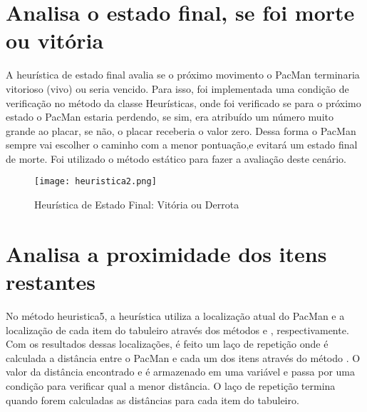 \documentclass[12pt, a4paper, english, brazil]{abntex2}
\begin{document}
    \section{Analisa o estado final, se foi morte ou vitória}
 A heurística de estado final avalia se o próximo movimento o PacMan terminaria vitorioso (vivo) ou seria vencido. Para isso, foi implementada uma condição de verificação no método da classe Heurísticas, onde foi verificado se para o próximo estado o PacMan estaria perdendo, se sim, era atribuído um número muito grande ao placar, se não, o placar receberia o valor zero.
 Dessa forma o PacMan sempre vai escolher o caminho com a menor pontuação,e evitará um estado final de morte. Foi utilizado o método estático  para fazer a avaliação deste cenário.
    \begin{figure}[H]
    \centering
    \caption{Heurística de Estado Final: Vitória ou Derrota}
    \texttt{[image: heuristica2.png]}
    \label{fig:heuristica2}
    \end{figure}

    
    \section{Analisa a proximidade dos itens restantes}
 No método heuristica5, a heurística utiliza a localização atual do PacMan e a localização de cada item do tabuleiro através dos métodos  e , respectivamente. Com os resultados dessas localizações, é feito um laço de repetição onde é calculada a distância entre o PacMan e cada um dos itens através do método .
 O valor da distância encontrado e é armazenado em uma variável e passa por uma condição para verificar qual a menor distância. O laço de repetição termina quando forem calculadas as distâncias para cada item do tabuleiro.
  
\end{document}
